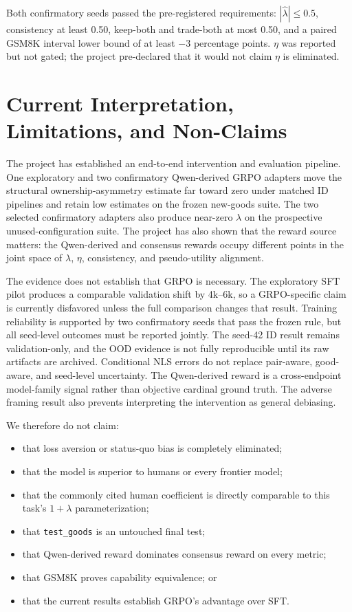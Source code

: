 \documentclass[11pt,letterpaper]{article}
\begin{document}
Both confirmatory seeds passed the pre-registered requirements:
$|\widehat\lambda|\leq0.5$, consistency at least 0.50, keep-both and trade-both
at most 0.50, and a paired GSM8K interval lower bound of at least $-3$
percentage points. $\eta$ was reported but not gated; the project
pre-declared that it would not claim $\eta$ is eliminated.

\FloatBarrier
\section{Current Interpretation, Limitations, and Non-Claims}

The project has established an end-to-end intervention and evaluation
pipeline. One exploratory and two confirmatory Qwen-derived GRPO adapters move
the structural ownership-asymmetry estimate far toward zero under matched
ID pipelines and retain low estimates on the frozen new-goods suite. The two
selected confirmatory adapters also produce near-zero $\lambda$ on the
prospective unused-configuration suite. The project has also
shown that the reward source matters: the Qwen-derived and consensus rewards
occupy different points in the joint space of $\lambda$, $\eta$, consistency,
and pseudo-utility alignment.

The evidence does not establish that GRPO is necessary. The exploratory SFT
pilot produces a comparable validation shift by 4k--6k, so a GRPO-specific
claim is currently disfavored unless the full comparison changes that result.
Training reliability is supported by two
confirmatory seeds that pass the frozen rule, but all seed-level outcomes must
be reported jointly. The seed-42 ID result remains validation-only, and the
OOD evidence is not fully reproducible until its raw artifacts are archived.
Conditional NLS errors do not
replace pair-aware, good-aware, and seed-level uncertainty. The Qwen-derived
reward is a cross-endpoint model-family signal rather than objective cardinal
ground truth. The adverse framing result also prevents interpreting the
intervention as general debiasing.

We therefore do not claim:
\begin{itemize}
    \item that loss aversion or status-quo bias is completely eliminated;
    \item that the model is superior to humans or every frontier model;
    \item that the commonly cited human coefficient is directly comparable to
          this task's $1+\lambda$ parameterization;
    \item that \texttt{test\_goods} is an untouched final test;
    \item that Qwen-derived reward dominates consensus reward on every metric;
    \item that GSM8K proves capability equivalence; or
    \item that the current results establish GRPO's advantage over SFT.
\end{itemize}
\end{document}
